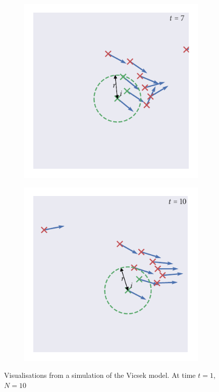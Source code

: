 \begin{figure}[tb]
    \begin{subfigure}[b]{0.5\textwidth}
        \includegraphics{vicsek_simulation_7.pdf}
    \end{subfigure}%
    \begin{subfigure}[b]{0.5\textwidth}
        \includegraphics{vicsek_simulation_10.pdf}
    \end{subfigure}
    \caption{Visualisations from a simulation of the Vicsek model. At time $t=1$, $N=10$
}
\end{figure}
